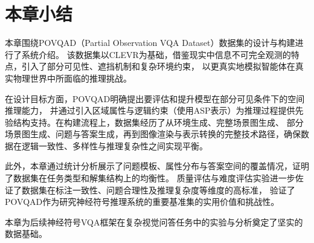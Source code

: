 \section{本章小结}
本章围绕POVQAD（Partial Observation VQA Dataset）数据集的设计与构建进行了系统介绍。
该数据集以CLEVR为基础，借鉴现实中信息不可完全观测的特点，引入了部分可见性、遮挡机制和复杂环境约束，
以更真实地模拟智能体在真实物理世界中所面临的推理挑战。

在设计目标方面，POVQAD明确提出要评估和提升模型在部分可见条件下的空间推理能力，
并通过引入区域属性与逻辑约束（使用ASP表示）为推理过程提供先验结构支持。在构建流程上，数据集经历了从环境生成、完整场景图生成、
部分场景图生成、问题与答案生成，再到图像渲染与表示转换的完整技术路径，确保数据在逻辑一致性、多样性与推理复杂性之间实现平衡。

此外，本章通过统计分析展示了问题模板、属性分布与答案空间的覆盖情况，证明了数据集在任务类型和解集结构上的均衡性。
质量评估与难度评估实验进一步佐证了数据集在标注一致性、问题合理性及推理复杂度等维度的高标准，
验证了POVQAD作为研究神经符号推理系统的重要基准集的实用价值和挑战性。

本章为后续神经符号VQA框架在复杂视觉问答任务中的实验与分析奠定了坚实的数据基础。